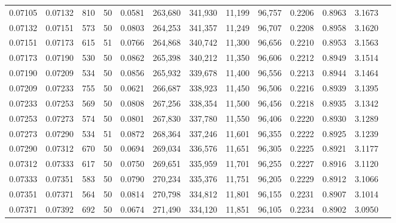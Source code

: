\begin{tabular}{rrrrrrrrrrrrr}
0.07105 & 0.07132 &   810 &  50 &                                     0.0581 & 263,680 & 341,930 &  11,199 &  96,757 & 0.2206 & 0.8963 & 3.1673 \\
0.07132 & 0.07151 &   573 &  50 &                                     0.0803 & 264,253 & 341,357 &  11,249 &  96,707 & 0.2208 & 0.8958 & 3.1620 \\
0.07151 & 0.07173 &   615 &  51 &                                     0.0766 & 264,868 & 340,742 &  11,300 &  96,656 & 0.2210 & 0.8953 & 3.1563 \\
0.07173 & 0.07190 &   530 &  50 &                                     0.0862 & 265,398 & 340,212 &  11,350 &  96,606 & 0.2212 & 0.8949 & 3.1514 \\
0.07190 & 0.07209 &   534 &  50 &                                     0.0856 & 265,932 & 339,678 &  11,400 &  96,556 & 0.2213 & 0.8944 & 3.1464 \\
0.07209 & 0.07233 &   755 &  50 &                                     0.0621 & 266,687 & 338,923 &  11,450 &  96,506 & 0.2216 & 0.8939 & 3.1395 \\
0.07233 & 0.07253 &   569 &  50 &                                     0.0808 & 267,256 & 338,354 &  11,500 &  96,456 & 0.2218 & 0.8935 & 3.1342 \\
0.07253 & 0.07273 &   574 &  50 &                                     0.0801 & 267,830 & 337,780 &  11,550 &  96,406 & 0.2220 & 0.8930 & 3.1289 \\
0.07273 & 0.07290 &   534 &  51 &                                     0.0872 & 268,364 & 337,246 &  11,601 &  96,355 & 0.2222 & 0.8925 & 3.1239 \\
0.07290 & 0.07312 &   670 &  50 &                                     0.0694 & 269,034 & 336,576 &  11,651 &  96,305 & 0.2225 & 0.8921 & 3.1177 \\
0.07312 & 0.07333 &   617 &  50 &                                     0.0750 & 269,651 & 335,959 &  11,701 &  96,255 & 0.2227 & 0.8916 & 3.1120 \\
0.07333 & 0.07351 &   583 &  50 &                                     0.0790 & 270,234 & 335,376 &  11,751 &  96,205 & 0.2229 & 0.8912 & 3.1066 \\
0.07351 & 0.07371 &   564 &  50 &                                     0.0814 & 270,798 & 334,812 &  11,801 &  96,155 & 0.2231 & 0.8907 & 3.1014 \\
0.07371 & 0.07392 &   692 &  50 &                                     0.0674 & 271,490 & 334,120 &  11,851 &  96,105 & 0.2234 & 0.8902 & 3.0950 \\

\end{tabular}
